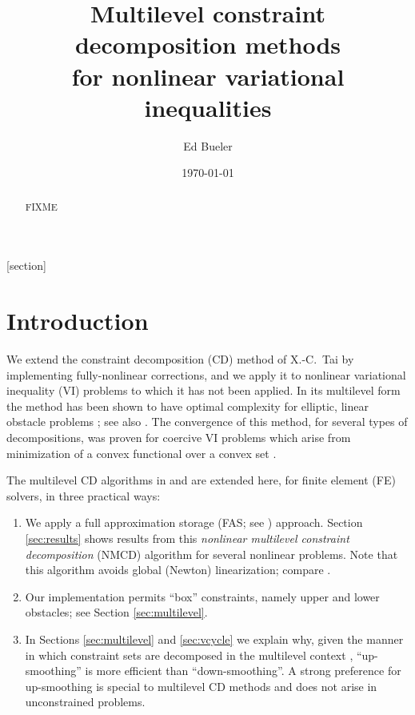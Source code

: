 \documentclass[letterpaper,final,12pt,reqno]{amsart}
\theoremstyle{cstyle}
\theoremstyle{cstyle*}
\theoremstyle{dstyle}
\numberwithin{equation}{section}
\numberwithin{figure}{section}
\numberwithin{table}{section}
\numberwithin{theorem}{section}
\begin{document}
\title[Multilevel constraint decomposition methods]{Multilevel constraint decomposition methods \\ for nonlinear variational inequalities}

\author{Ed Bueler}

\date{\today}

\begin{abstract} FIXME
\end{abstract}

\maketitle


\thispagestyle{empty}

[section]


\section{Introduction} \label{sec:intro}

We extend the constraint decomposition (CD) method of X.-C.~Tai \cite{Tai2003} by implementing fully-nonlinear corrections, and we apply it to nonlinear variational inequality (VI) problems to which it has not been applied.  In its multilevel form the method has been shown to have optimal complexity for elliptic, linear obstacle problems \cite[Subsection 5.4]{Tai2003}; see also \cite[Theorem 4.6 and Algorithm 4.7]{GraeserKornhuber2009}.  The convergence of this method, for several types of decompositions, was proven for coercive VI problems which arise from minimization of a convex functional over a convex set \cite{Tai2003}.

The multilevel CD algorithms in \cite{GraeserKornhuber2009} and \cite{Tai2003} are extended here, for finite element (FE) solvers, in three practical ways:
\renewcommand{\labelenumi}{\emph{(\roman{enumi})}}
\begin{enumerate}
\item We apply a full approximation storage (FAS; see \cite{Brandt1977,Bruneetal2015}) approach.  Section \ref{sec:results} shows results from this \emph{nonlinear multilevel constraint decomposition} (NMCD) algorithm  for several nonlinear problems.  Note that this algorithm avoids global (Newton) linearization; compare \cite{GraeserKornhuber2009}.
\item Our implementation permits ``box'' constraints, namely upper and lower obstacles; see Section \ref{sec:multilevel}.
\item In Sections \ref{sec:multilevel} and \ref{sec:vcycle} we explain why, given the manner in which constraint sets are decomposed in the multilevel context \cite{GraeserKornhuber2009}, ``up-smoothing'' is more efficient than ``down-smoothing''.  A strong preference for up-smoothing is special to multilevel CD methods and does not arise in unconstrained problems.
\end{enumerate}
\end{document}
